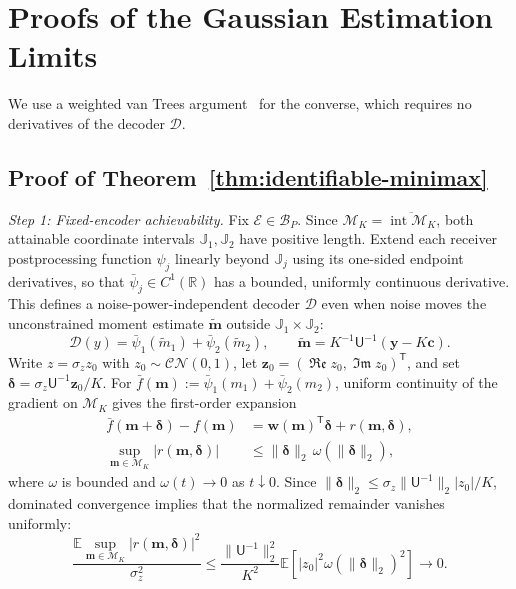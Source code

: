 \documentclass[journal,12pt,onecolumn,draftclsnofoot]{IEEEtran}
\newcommand{\enc}{\mathscr{E}}\newcommand{\dec}{\mathscr{D}}\newcommand{\R}{\mathbb R}\newcommand{\C}{\mathbb C}
\newcommand{\T}{\mathsf T}\newcommand{\suc}{\succeq}
\renewcommand{\Re}{\mathop{\mathfrak{Re}}\nolimits}
\renewcommand{\Im}{\mathop{\mathfrak{Im}}\nolimits}
\begin{document}
\section{Proofs of the Gaussian Estimation Limits}\label{app:statistical-converse}


 We use a weighted van Trees argument~\cite{gill1995,tsang2020} for the converse, which requires no derivatives of the decoder $\dec$.
 



\subsection{Proof of Theorem~\ref{thm:identifiable-minimax}}\label{app:identifiable-minimax-proof}


\emph{Step 1: Fixed-encoder achievability.}
Fix $\enc\in\mathcal B_P$. Since $\mathcal M_K=\overline{\operatorname{int}\mathcal M_K}$, both attainable coordinate intervals $\mathbb J_1,\mathbb J_2$ have positive length.
Extend each receiver postprocessing function $\psi_j$ linearly beyond $\mathbb J_j$ using its one-sided endpoint derivatives, so that $\bar\psi_j\in C^1(\R)$ has a bounded, uniformly continuous derivative. 
This defines a noise-power-independent decoder $\dec$ even when noise moves the unconstrained moment estimate $\tilde{\boldsymbol m}$ outside $\mathbb J_1\times\mathbb J_2$:
$$
 \dec(y)=\bar\psi_1(\tilde m_1)+\bar\psi_2(\tilde m_2),
 \qquad
 \tilde{\boldsymbol m}
 =K^{-1}\mathsf U^{-1}(\boldsymbol y-K\boldsymbol c).
$$
Write $z=\sigma_z z_0$ with $z_0\sim\mathcal{CN}(0,1)$, let $\boldsymbol z_0=(\Re z_0,\Im z_0)^\T$, and set $\boldsymbol\delta=\sigma_z\mathsf U^{-1}\boldsymbol z_0/K$.
For $\bar f(\boldsymbol m):=\bar\psi_1(m_1)+\bar\psi_2(m_2)$, uniform continuity of the gradient on $\mathcal M_K$ gives the first-order expansion
\begin{align}
 \bar f(\boldsymbol m+\boldsymbol\delta)-f(\boldsymbol m)
 &=\boldsymbol w(\boldsymbol m)^\T\boldsymbol\delta
   +r(\boldsymbol m,\boldsymbol\delta),\\
 \sup_{\boldsymbol m\in\mathcal M_K}
 |r(\boldsymbol m,\boldsymbol\delta)|
 &\le\|\boldsymbol\delta\|_2\,\omega(\|\boldsymbol\delta\|_2),
\end{align}
where $\omega$ is bounded and $\omega(t)\to0$ as $t\downarrow0$.
Since $\|\boldsymbol\delta\|_2\le\sigma_z\|\mathsf U^{-1}\|_2|z_0|/K$, dominated convergence implies that the normalized remainder vanishes uniformly:
$$
 \frac{\mathbb E\sup_{\boldsymbol m\in\mathcal M_K}
 |r(\boldsymbol m,\boldsymbol\delta)|^2}{\sigma_z^2}
 \le\frac{\|\mathsf U^{-1}\|_2^2}{K^2}
 \mathbb E\!\left[|z_0|^2\omega(\|\boldsymbol\delta\|_2)^2\right]
 \longrightarrow0.
$$
\end{document}
